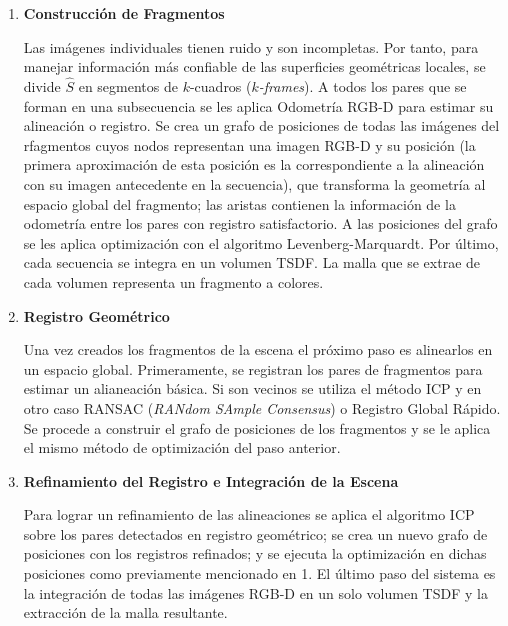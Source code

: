 \begin{enumerate}
	\item \textbf{Construcción de Fragmentos}
	
	Las imágenes individuales tienen ruido y son incompletas. Por tanto, para manejar información más confiable de las superficies geométricas locales, se divide $\hat{S}$ en segmentos de $k$-cuadros (\textit{$k$-frames}). A todos los pares que se forman en una subsecuencia se les aplica Odometría RGB-D para estimar su alineación o registro. Se crea un grafo de posiciones de todas las imágenes del rfagmentos cuyos nodos representan una imagen RGB-D  y su posición (la primera aproximación de esta posición es la correspondiente a la alineación con su imagen antecedente en la secuencia), que transforma la geometría al espacio global del fragmento; las aristas contienen la información de la odometría entre los pares con registro satisfactorio. A las posiciones del grafo se les aplica optimización con el algoritmo Levenberg-Marquardt. Por último, cada secuencia se integra en un volumen TSDF. La malla que se extrae de cada volumen representa un fragmento a colores.
	
	\item \textbf{Registro Geométrico}
	
	Una vez creados los fragmentos de la escena el próximo paso es alinearlos en un espacio global. Primeramente, se registran los pares de  fragmentos para estimar un alianeación básica. Si son vecinos se utiliza el método ICP y en otro caso RANSAC (\textit{RANdom SAmple Consensus}) o Registro Global Rápido. Se procede a construir el grafo de posiciones de los fragmentos y se le aplica el mismo método de optimización del paso anterior.
	
	\item \textbf{Refinamiento del Registro e Integración de la Escena}
	
	Para lograr un refinamiento de las alineaciones se aplica el algoritmo ICP sobre los pares detectados en registro geométrico; se crea un nuevo grafo de posiciones con los registros refinados; y se ejecuta la optimización en dichas posiciones como previamente mencionado en 1. El último paso del sistema es la integración de todas las imágenes RGB-D en un solo volumen TSDF y la extracción de la malla resultante.
\end{enumerate}

